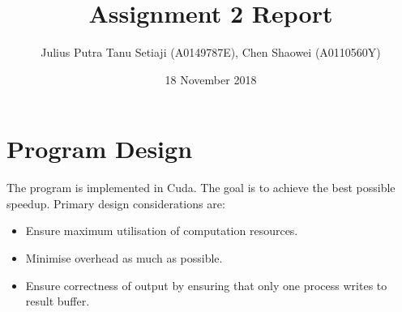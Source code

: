 \documentclass[a4paper,12pt]{article}
\title{Assignment 2 Report}
\author{Julius Putra Tanu Setiaji (A0149787E), Chen Shaowei (A0110560Y)}
\date{18 November 2018}
\begin{document}
\maketitle

\section{Program Design}
The program is implemented in Cuda. The goal is to achieve the best possible speedup. Primary design considerations are:
\begin{itemize}
  \item Ensure maximum utilisation of computation resources.
  \item Minimise overhead as much as possible.
  \item Ensure correctness of output by ensuring that only one process writes to result buffer.
\end{itemize}
\end{document}
